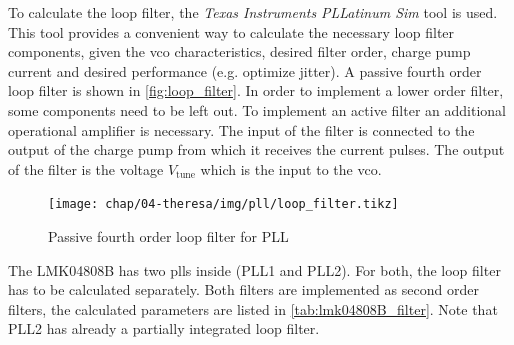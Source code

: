 To calculate the loop filter, the \textit{Texas Instruments} \textit{PLLatinum Sim} tool is used. 
This tool provides a convenient way to calculate the necessary loop filter components, given the \gls{vco} characteristics, desired filter order, charge pump current and desired performance (e.g. optimize jitter). 
A passive fourth order loop filter is shown in \autoref{fig:loop_filter}.
In order to implement a lower order filter, some components need to be left out.
To implement an active filter an additional operational amplifier is necessary.
The input of the filter is connected to the output of the charge pump from which it receives the current pulses.
The output of the filter is the voltage $V_\text{tune}$ which is the input to the \gls{vco}.
\begin{figure}[tb]
	\centering
	\tikzexternaldisable
	\texttt{[image: chap/04-theresa/img/pll/loop\_filter.tikz]}
	\caption[PLL loop filter components]{Passive fourth order loop filter for PLL}
	\tikzexternalenable
	\label{fig:loop_filter}
\end{figure}
The LMK04808B has two \glspl{pll} inside (PLL1 and PLL2).
For both, the loop filter has to be calculated separately. 
Both filters are implemented as second order filters, the calculated parameters are listed in \autoref{tab:lmk04808B_filter}.
Note that PLL2 has already a partially integrated loop filter.
